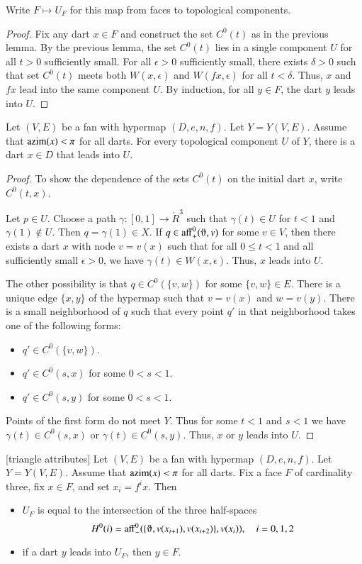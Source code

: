 Write $F\mapsto U_F$ for this map from faces to topological components.

\begin{proof}  Fix any dart $x\in F$ and construct the set $C^0(t)$ as
in the previous lemma.  By the previous lemma, the set $C^0(t)$ lies in a single
component $U$ for all $t>0$ sufficiently small.  For all $\epsilon>0$
sufficiently small, there exists $\delta>0$ such that set $C^0(t)$ meets
both $W(x,\epsilon)$ and $W(f x,\epsilon)$ for all $t<\delta$.  Thus,
$x$ and $f x$ lead into the same component $U$.  By induction, for all
$y\in F$, the dart $y$ leads into $U$.
\end{proof}

\begin{lemma}
Let $(V,E)$ be a fan with hypermap $(D,e,n,f)$. Let $Y=Y(V,E)$. Assume that ${\operatorname{azim}}(x)<\pi$ for all darts.  For every topological component $U$ of $Y$, there is a dart $x\in D$ that leads into $U$.
\end{lemma}

\begin{proof}  
To show the dependence of the sets $C^0(t)$ on the initial dart $x$, write $C^0(t,x)$.

Let $p\in U$.  Choose a path $\gamma:[0,1]\to \ring{R}^3$
such that $\gamma(t)\in U$ for $t<1$ and $\gamma(1)\not\in U$.  Then
$q=\gamma(1)\in X$.  If $q\in\op{aff}^0_+(\orgn,v)$ for some $v\in V$,
then there exists a dart $x$ with node $v = v(x)$ such that for 
all $0\le t < 1$ and all sufficiently
small $\epsilon>0$, we have $\gamma(t)\in W(x,\epsilon)$.  Thus,
$x$ leads into $U$.

The other possibility is that
$q\in C^0(\{v,w\})$ for some $\{v,w\}\in E$.  There is a unique
edge $\{x,y\}$ of the hypermap such that $v=v(x)$ and $w=v(y)$.  
There
is a small neighborhood of $q$ such that every point $q'$ in that neighborhood
takes one of the following forms:
\begin{itemize} \item $q'\in C^0(\{v,w\})$.
\item $q'\in C^0(s,x)$ for some $0<s<1$.
\item $q'\in C^0(s,y)$ for some $0<s<1$.
\end{itemize}
Points of the first form do not meet $Y$.  Thus for some $t<1$ and $s<1$
we have $\gamma(t)\in C^0(s,x)$ or $\gamma(t)\in C^0(s,y)$.  Thus,
$x$ or $y$ leads into $U$.
\end{proof}

\begin{lemma}[triangle attributes] \label{lemma:triangle}
Let $(V,E)$ be a fan with hypermap $(D,e,n,f)$. 
Let $Y=Y(V,E)$.
Assume that ${\operatorname{azim}}(x)<\pi$
for all darts.  Fix a face $F$ of cardinality three, fix
$x\in F$, and set $x_i = f^i x$. Then
\begin{itemize}  
\item $U_F$ is equal to the intersection of the three half-spaces
$$H^0(i)=\op{aff}_-^0(\{\orgn,v(x_{i+1}),v(x_{i+2})\},v(x_i)),\quad i=0,1,2$$
\item if a dart $y$ leads into $U_F$, then $y\in F$.
\end{itemize}
\end{lemma}

